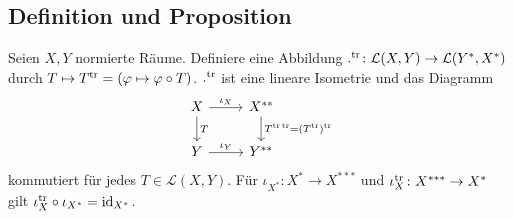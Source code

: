 \subsection[Definition und Proposition: Die transponierte Abbildung]{Definition und Proposition} %
\label{sub:34}
Seien $X,Y$ normierte Räume. Definiere eine Abbildung $.^{\mathrm{tr}} \colon \mathcal{L}(X,Y) \to \mathcal{L}(Y^*,X^*)$ durch $T \mapsto T^{\mathrm{tr}} = (\varphi \mapsto \varphi \circ T)$.
$.^{\mathrm{tr}}$ ist eine lineare Isometrie und das Diagramm
\[
	\begin{tikzcd}
		X \rar["\iota_X"] \dar["T"]& X^{**} \dar["T^{\tr \, \tr}= (T^\tr)^\tr"]\\
		Y \rar["\iota_Y"]& Y^{**}
	\end{tikzcd}
\]
kommutiert für jedes $T \in \mathcal{L}(X,Y)$. Für $\iota_{X^*} \colon X^* \to X^{***}$ und $\iota_{X}^{\mathrm{tr}} \colon X^{***} \to X^*$ gilt $\iota_X^{\mathrm{tr}} \circ \iota_{X^*} = \operatorname{id}_{X^*}$.

